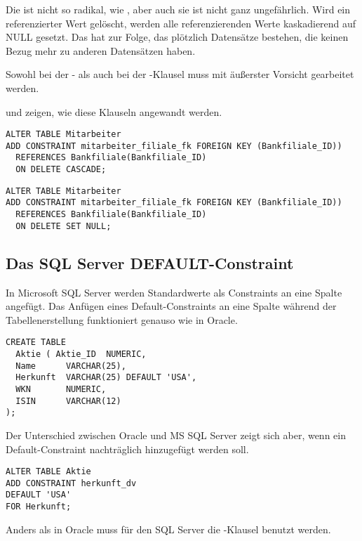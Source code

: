         Die  ist nicht so radikal, wie , aber auch sie ist nicht ganz ungef\"ahrlich. Wird ein referenzierter Wert gel\"oscht, werden alle referenzierenden Werte kaskadierend auf NULL gesetzt. Das hat zur Folge, das pl\"otzlich Datens\"atze bestehen, die keinen Bezug mehr zu anderen Datens\"atzen haben.
        \begin{merke}
          Sowohl bei der - als auch bei der -Klausel muss mit \"au\ss erster Vorsicht gearbeitet werden.
        \end{merke}
         und  zeigen, wie diese Klauseln angewandt werden.
        \begin{lstlisting}[language=oracle_sql,caption={Ein Foreign Key-Constraint mit ON DELETE CASCADE-Klausel},label=sql09_17]
ALTER TABLE Mitarbeiter
ADD CONSTRAINT mitarbeiter_filiale_fk FOREIGN KEY (Bankfiliale_ID))
  REFERENCES Bankfiliale(Bankfiliale_ID)
  ON DELETE CASCADE;
        \end{lstlisting}

        \begin{lstlisting}[language=oracle_sql,caption={Ein Foreign Key-Constraint mit ON DELETE SET NULL-Klausel},label=sql09_18]
ALTER TABLE Mitarbeiter
ADD CONSTRAINT mitarbeiter_filiale_fk FOREIGN KEY (Bankfiliale_ID))
  REFERENCES Bankfiliale(Bankfiliale_ID)
  ON DELETE SET NULL;
        \end{lstlisting}
      \subsection{Das SQL Server DEFAULT-Constraint}
        In Microsoft SQL Server werden Standardwerte als Constraints an eine
        Spalte angefügt. Das Anfügen eines Default-Constraints an eine Spalte
        während der Tabellenerstellung funktioniert genauso wie in Oracle.
          \begin{lstlisting}[language=ms_sql,caption={Erstellen
          einer Tabelle mit einem Standardwert},label=sql09_18a]
CREATE TABLE
  Aktie ( Aktie_ID  NUMERIC,
  Name      VARCHAR(25),
  Herkunft  VARCHAR(25) DEFAULT 'USA',
  WKN       NUMERIC,
  ISIN      VARCHAR(12)
);
          \end{lstlisting}
          Der Unterschied zwischen Oracle und MS SQL Server zeigt sich aber,
          wenn ein Default-Constraint nachträglich hinzugefügt werden soll.
          \begin{lstlisting}[language=ms_sql,caption={Tabellenspalte mit
          Standardwert hinzuf\"ugen in SQL Server},label=sql09_18b] 
ALTER TABLE Aktie
ADD CONSTRAINT herkunft_dv
DEFAULT 'USA'
FOR Herkunft;
          \end{lstlisting}
          Anders als in Oracle muss für den SQL Server die -Klausel benutzt werden.
